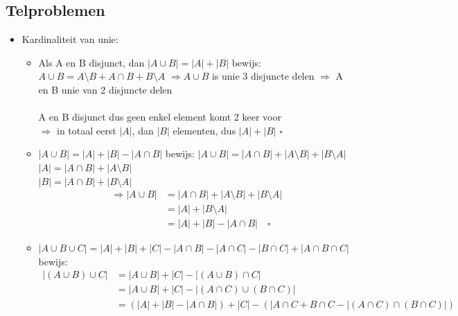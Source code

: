 \documentclass{article}
\begin{document}
\subsection{Telproblemen}
\begin{itemize}
    \item Kardinaliteit van unie: 
    \begin{itemize}
        \item Als A en B disjunct, dan $|A \cup B| = |A| + |B|$
        \newline bewijs: $A \cup B = A \setminus B + A \cap B + B \setminus A$
        \newline $\Rightarrow A \cup B$ is unie 3 disjuncte delen
        \newline $\Rightarrow$ A en B unie van 2 disjuncte delen
        \\\\ A en B disjunct dus geen enkel element komt 2 keer voor
        \\ $\Rightarrow$ in totaal eerst $|A|$, dan $|B|$ elementen, dus $|A| + |B|$ \quad $\square$
        \item $|A \cup B| = |A| + |B| - |A \cap B|$
        \newline bewijs: $|A \cup B| = |A \cap B| + |A \setminus B| + |B \setminus A|$
        \\ $|A| = |A \cap B| + |A \setminus B|$
        \\ $|B| = |A \cap B| + |B \setminus A|$
        \begin{equation*}
            \begin{split} 
                \Rightarrow |A \cup B| & = |A \cap B| + |A \setminus B| + |B \setminus A| \\ & = |A| + |B \setminus A| \\ & = |A| + |B| - |A \cap B| \quad \square
            \end{split}
        \end{equation*}
        \item $ |A \cup B \cup C| = |A| + |B| + |C| - |A \cap B| - |A \cap C| - |B \cap C| + |A \cap B \cap C|$
        \newline bewijs: 
        \begin{equation*}
            \begin{split}
                |(A \cup B) \cup C| & = |A \cup B| + |C| - |(A \cup B) \cap C| \\
                & = |A \cup B| + |C| - |(A \cap C) \cup (B \cap C)| \\
                & = (|A| + |B| - |A \cap B|) + |C| - (|A \cap C + B \cap C - |(A \cap C) \cap (B \cap C)|) \\

\end{split}
\end{equation*}
\end{itemize}
\end{itemize}
\end{document}
